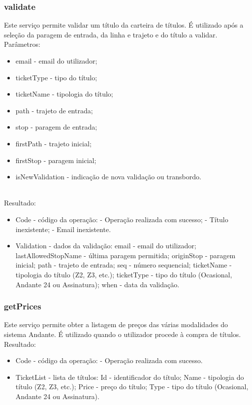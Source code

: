 \subsubsection{validate}

Este serviço permite validar um título da carteira de títulos. É utilizado após a seleção da paragem de entrada, da linha e trajeto e do título a validar.
\newline
~\\Parâmetros:
\begin{itemize}
\item email - email do utilizador;
\item ticketType - tipo do título;
\item ticketName - tipologia do título;
\item path - trajeto de entrada;
\item stop - paragem de entrada;
\item firstPath - trajeto inicial;
\item firstStop - paragem inicial;
\item isNewValidation - indicação de nova validação ou transbordo.
\end{itemize}

~\\Resultado:
\begin{itemize}
\item Code - código da operação:
 - Operação realizada com sucesso;
 - Título inexistente;
 - Email inexistente.
\item Validation - dados da validação:
\subitem email - email do utilizador;
\subitem lastAllowedStopName - última paragem permitida;
\subitem originStop - paragem inicial;
\subitem path - trajeto de entrada;
\subitem seq - número sequencial;
\subitem ticketName - tipologia do título (Z2, Z3, etc.);
\subitem ticketType - tipo do título (Ocasional, Andante 24 ou Assinatura);
\subitem when - data da validação.
\end{itemize}

\subsubsection{getPrices}

Este serviço permite obter a listagem de preços das várias modalidades do sistema Andante. É utilizado quando o utilizador procede à compra de títulos.
\newline
~\\Resultado:
\begin{itemize}
\item Code - código da operação:
 - Operação realizada com sucesso.
\item TicketList - lista de títulos:
\subitem Id - identificador do título;
\subitem Name - tipologia do título (Z2, Z3, etc.);
\subitem Price - preço do título;
\subitem Type - tipo do título (Ocasional, Andante 24 ou Assinatura).
\end{itemize}

